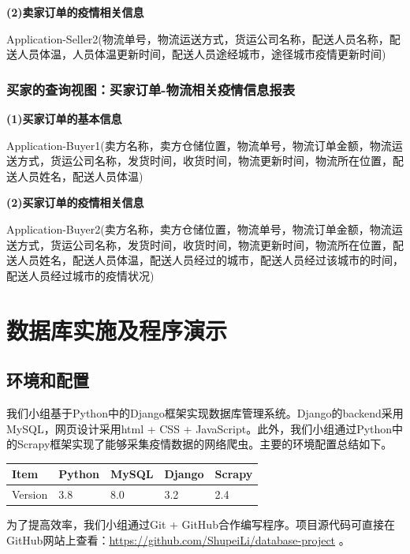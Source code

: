 \documentclass[12pt]{article}
\begin{document}
\vspace{0.3cm}
\noindent \textbf{(2)卖家订单的疫情相关信息} \par 
\noindent Application-Seller2(物流单号，物流运送方式，货运公司名称，配送人员名称，配送人员体温，人员体温更新时间，配送人员途经城市，途径城市疫情更新时间)

\subsubsection{买家的查询视图：买家订单-物流相关疫情信息报表}

\noindent \textbf{(1)买家订单的基本信息} \par 
\noindent Application-Buyer1(卖方名称，卖方仓储位置，物流单号，物流订单金额，物流运送方式，货运公司名称，发货时间，收货时间，物流更新时间，物流所在位置，配送人员姓名，配送人员体温)

\vspace{0.3cm}
\noindent \textbf{(2)买家订单的疫情相关信息} \par 
\noindent Application-Buyer2(卖方名称，卖方仓储位置，物流单号，物流订单金额，物流运送方式，货运公司名称，发货时间，收货时间，物流更新时间，物流所在位置，配送人员姓名，配送人员体温，配送人员经过的城市，配送人员经过该城市的时间，配送人员经过城市的疫情状况)

\newpage
\section{数据库实施及程序演示}
\subsection{环境和配置}

我们小组基于Python中的Django框架实现数据库管理系统。Django的backend采用MySQL，网页设计采用html + CSS + JavaScript。此外，我们小组通过Python中的Scrapy框架实现了能够采集疫情数据的网络爬虫。主要的环境配置总结如下。

\begin{center}
	\begin{tabular}{lllll}
	\toprule
	Item & Python & MySQL & Django & Scrapy \\
	\midrule
	Version & 3.8 & 8.0 & 3.2 & 2.4\\
	\bottomrule
\end{tabular}
\end{center}

为了提高效率，我们小组通过Git + GitHub合作编写程序。项目源代码可直接在GitHub网站上查看：\url{https://github.com/ShupeiLi/database-project} 。
\end{document}
